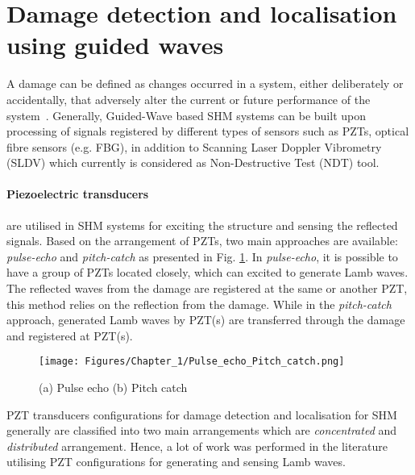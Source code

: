 \section[Damage identification]{Damage detection and localisation using guided waves}
\label{sec13}

A damage can be defined as changes occurred in a system, either deliberately or accidentally, that adversely alter the current or future performance of the system~\cite{Farrar2012}. 
Generally, Guided-Wave based SHM systems can be built upon processing of signals registered by different types of sensors such as PZTs, optical fibre sensors (e.g. FBG), in addition to Scanning Laser Doppler Vibrometry (SLDV) which currently is considered as Non-Destructive Test (NDT) tool.
\paragraph{Piezoelectric transducers} are utilised in SHM systems for exciting the structure and sensing the reflected signals. 
Based on the arrangement of PZTs, two main approaches are available: \emph{pulse-echo} and \emph{pitch-catch} as presented in Fig. \ref{fig:Pulse_echo_Pitch_catch}.
In \emph{pulse-echo}, it is possible to have a group of PZTs located closely, which can excited to generate Lamb waves. 
The reflected waves from the damage are registered at the same or another PZT, this method relies on the reflection from the damage. 
While in the \emph{pitch-catch} approach, generated Lamb waves by PZT(s) are transferred through the damage and registered at PZT(s).
\begin{figure}[!ht]
	\begin{center}
		\centering
		\texttt{[image: Figures/Chapter\_1/Pulse\_echo\_Pitch\_catch.png]}
	\end{center}
	\caption{(a) Pulse echo	(b) Pitch catch} 
	\label{fig:Pulse_echo_Pitch_catch}
\end{figure}
PZT transducers configurations for damage detection and localisation for SHM generally are classified into two main arrangements which are \emph{concentrated} and \emph{distributed} arrangement. 
Hence, a lot of work was performed in the literature utilising PZT configurations for generating and sensing  Lamb waves.

